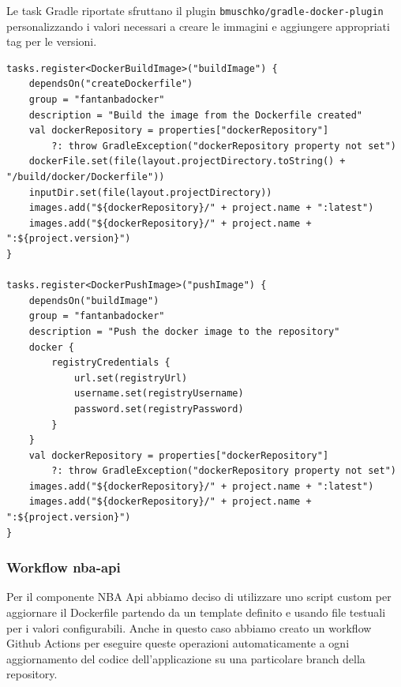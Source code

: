 Le task Gradle riportate sfruttano il plugin \texttt{bmuschko/gradle-docker-plugin} personalizzando i valori necessari a creare le immagini e aggiungere appropriati tag per le versioni.

\begin{verbatim}
tasks.register<DockerBuildImage>("buildImage") {
    dependsOn("createDockerfile")
    group = "fantanbadocker"
    description = "Build the image from the Dockerfile created"
    val dockerRepository = properties["dockerRepository"] 
        ?: throw GradleException("dockerRepository property not set")
    dockerFile.set(file(layout.projectDirectory.toString() + "/build/docker/Dockerfile"))
    inputDir.set(file(layout.projectDirectory))
    images.add("${dockerRepository}/" + project.name + ":latest")
    images.add("${dockerRepository}/" + project.name + ":${project.version}")
}

tasks.register<DockerPushImage>("pushImage") {
    dependsOn("buildImage")
    group = "fantanbadocker"
    description = "Push the docker image to the repository"
    docker {
        registryCredentials {
            url.set(registryUrl)
            username.set(registryUsername)
            password.set(registryPassword)
        }
    }
    val dockerRepository = properties["dockerRepository"]
        ?: throw GradleException("dockerRepository property not set")
    images.add("${dockerRepository}/" + project.name + ":latest")
    images.add("${dockerRepository}/" + project.name + ":${project.version}")
}
\end{verbatim}

\subsubsection{Workflow nba-api}
Per il componente NBA Api abbiamo deciso di utilizzare uno script custom per aggiornare il Dockerfile partendo da un template definito e usando file testuali per i valori configurabili. Anche in questo caso abbiamo creato un workflow Github Actions per eseguire queste operazioni automaticamente a ogni aggiornamento del codice dell'applicazione su una particolare branch della repository.

